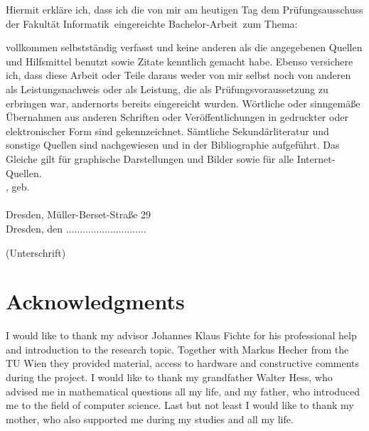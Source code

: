 \documentclass[a4paper, 12pt, bibliography=totoc]{scrartcl}
\begin{document}
\noindent
 Hiermit erkl\"{a}re ich, dass ich die von mir am heutigen Tag dem Pr\"{u}fungsausschuss der Fakult\"{a}t Informatik~eingereichte Bachelor-Arbeit~zum Thema:
\begin{center}
	\textit{\mytitle}
\end{center}
\noindent
vollkommen selbstst\"{a}ndig verfasst und keine anderen als die angegebenen Quellen und Hilfsmittel benutzt sowie Zitate kenntlich gemacht habe. Ebenso versichere ich, dass diese Arbeit
oder Teile daraus weder von mir selbst noch von anderen als Leistungsnachweis oder als Leistung, die als Prüfungsvoraussetzung
zu erbringen war, andernorts bereits eingereicht wurden. Wörtliche oder sinngemäße Übernahmen aus anderen Schriften
oder Veröffentlichungen in gedruckter oder elektronischer Form sind gekennzeichnet.
Sämtliche Sekundärliteratur und sonstige Quellen sind nachgewiesen und in der Bibliographie aufgeführt.
Das Gleiche gilt für graphische Darstellungen und Bilder sowie für alle Internet-Quellen. \\[20pt]

\noindent
\myauthor, geb. \mybirthday \\\\
 Dresden, Müller-Berset-Straße 29\\[80pt]


Dresden,  den \myabgabe \hfill .............................
\begin{flushright}
	(Unterschrift)\hspace{1em}
\end{flushright}


\newpage
\newpage
\section*{Acknowledgments}
\vspace{5ex}
I would like to thank my advisor Johannes Klaus Fichte for his professional help and introduction to the research topic. Together with Markus Hecher from the TU Wien they provided material, access to hardware and constructive comments during the project.
 I would like to thank my grandfather Walter Hess, who advised me in mathematical questions all my life, and my father, who introduced me to the field of computer science. Last but not least I would like to thank my mother, who also supported me during my studies and all my life. 
 \newpage
\newpage
\end{document}
